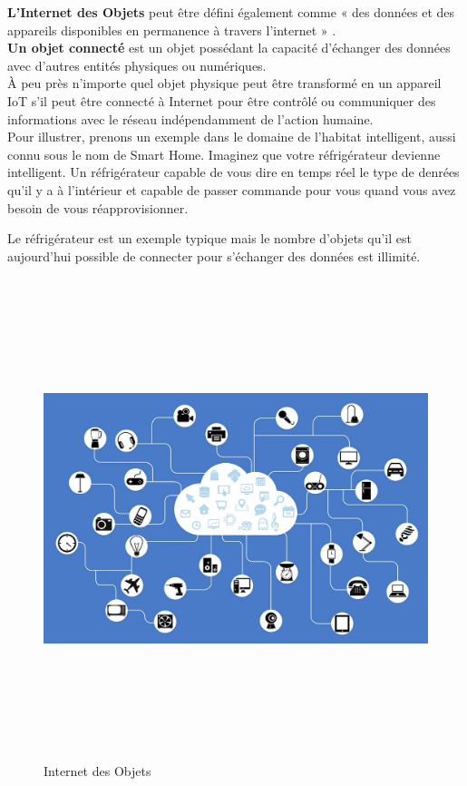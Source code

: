\textbf{L’Internet des Objets} peut être déf{\kern0pt}ini également comme « des données et des appareils disponibles en permanence à travers l’internet » \cite{hu2016security}.\\

\textbf{Un objet connecté} est un objet possédant la capacité d’échanger des données avec d’autres entités physiques ou numériques.\\

À peu près n'importe quel objet physique peut être transformé en un appareil IoT s'il peut être connecté à Internet pour être contrôlé ou communiquer des informations avec le réseau indépendamment de l’action humaine.\\

Pour illustrer, prenons un exemple dans le domaine de l’habitat intelligent, aussi connu sous le nom de Smart Home. Imaginez que votre réfrigérateur devienne intelligent. Un réfrigérateur capable de vous dire en temps réel le type de denrées qu’il y a à l’intérieur et capable de passer commande pour vous quand vous avez besoin de vous réapprovisionner.

Le réfrigérateur est un exemple typique mais le nombre d’objets qu’il est aujourd’hui possible de connecter pour s’échanger des données est illimité.\\

\begin{figure}[H]
	\begin{center}
		\includegraphics[width=16cm,height=14cm]{IMAGES/ORIGINALS/Internet_des_Objets_2}
	\end{center}
	\caption{Internet des Objets}
\end{figure}

